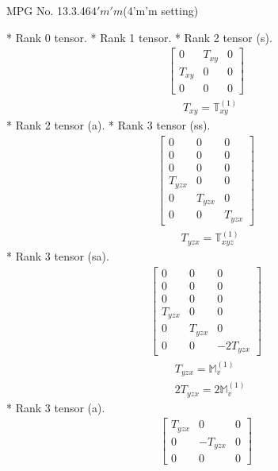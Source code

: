 \documentclass[fleqn,8pt,landscape]{jsarticle}
\begin{document}
\setcounter{MaxMatrixCols}{32}

\renewcommand{\tablename}{Table~}
\renewcommand{\figurename}{Figure~}
\begin{center}
\LARGE
MPG No. 13.3.46\quad$4'm'm$\quad(4'm'm setting)
\end{center}
* Rank 0 tensor.
* Rank 1 tensor.
* Rank 2 tensor (s).
\begin{align*}
\begin{bmatrix} 0 & T_{xy} & 0 \\ T_{xy} & 0 & 0 \\ 0 & 0 & 0 \end{bmatrix}
\end{align*}
\begin{align*}
& T_{xy} = \mathbb{T}_{xy}^{(1)}
\end{align*}
* Rank 2 tensor (a).
* Rank 3 tensor (ss).
\begin{align*}
\begin{bmatrix} 0 & 0 & 0 \\ 0 & 0 & 0 \\ 0 & 0 & 0 \\ T_{yzx} & 0 & 0 \\ 0 & T_{yzx} & 0 \\ 0 & 0 & T_{yzx} \end{bmatrix}
\end{align*}
\begin{align*}
& T_{yzx} = \mathbb{T}_{xyz}^{(1)}
\end{align*}
* Rank 3 tensor (sa).
\begin{align*}
\begin{bmatrix} 0 & 0 & 0 \\ 0 & 0 & 0 \\ 0 & 0 & 0 \\ T_{yzx} & 0 & 0 \\ 0 & T_{yzx} & 0 \\ 0 & 0 & - 2 T_{yzx} \end{bmatrix}
\end{align*}
\begin{align*}
& T_{yzx} = \mathbb{M}_{v}^{(1)} \\
& 2 T_{yzx} = 2 \mathbb{M}_{v}^{(1)}
\end{align*}
* Rank 3 tensor (a).
\begin{align*}
\begin{bmatrix} T_{yzx} & 0 & 0 \\ 0 & - T_{yzx} & 0 \\ 0 & 0 & 0 \end{bmatrix}
\end{align*}
\end{document}
